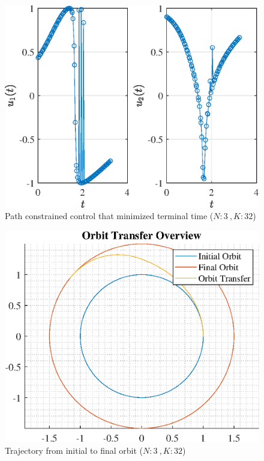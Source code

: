 \documentclass[]{article}
\begin{document}
\begin{figure}
	\centering
	\includegraphics[scale=0.75]{path_N3_K32_C3_tf.eps}
	\caption{Path constrained control that minimized terminal time (\(N:3\ , K:32\))}
	\label{fig:path_N3_K32_C3_tf}
\end{figure}
\begin{figure}
	\centering
	\includegraphics[scale=0.75]{orbit_N3_K32_C3_tf.eps}
	\caption{Trajectory from initial to final orbit (\(N:3\ , K:32\))}
	\label{fig:orbit_N3_K32_C3_tf}
\end{figure}
\end{document}
